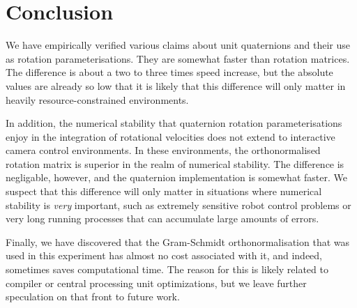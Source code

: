 \documentclass{acm_proc_article-sp}
\begin{document}
\section{Conclusion}

We have empirically verified various claims about unit quaternions and their use as rotation parameterisations.
They are somewhat faster than rotation matrices.
The difference is about a two to three times speed increase, but the absolute values are already so low that it is likely that this difference will only matter in heavily resource-constrained environments.

In addition, the numerical stability that quaternion rotation parameterisations enjoy in the integration of rotational velocities does not extend to interactive camera control environments.
In these environments, the orthonormalised rotation matrix is superior in the realm of numerical stability.
The difference is negligable, however, and the quaternion implementation is somewhat faster.
We suspect that this difference will only matter in situations where numerical stability is \emph{very} important, such as extremely sensitive robot control problems or very long running processes that can accumulate large amounts of errors.

Finally, we have discovered that the Gram-Schmidt orthonormalisation that was used in this experiment has almost no cost associated with it, and indeed, sometimes saves computational time.
The reason for this is likely related to compiler or central processing unit optimizations, but we leave further speculation on that front to future work.



\end{document}
